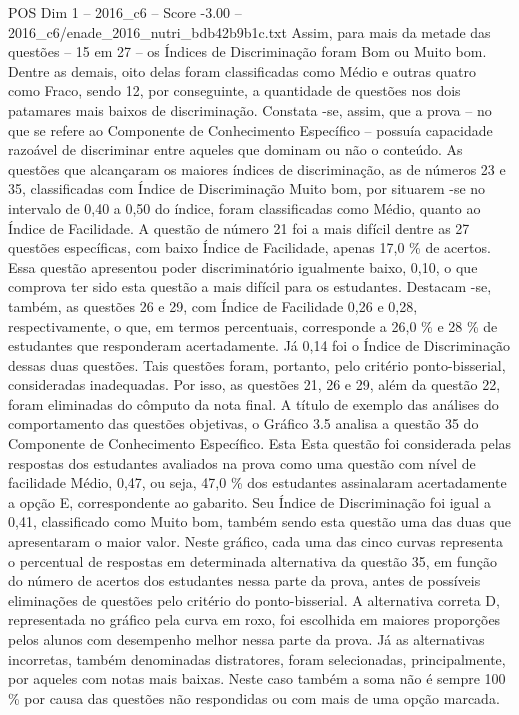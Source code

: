 \begin{textsample}{POS Dim 1 – 2016\_c6 – Score -3.00 – 2016\_c6/enade\_2016\_nutri\_bdb42b9b1c.txt}
Assim, para mais da metade das questões – 15 em 27 – os Índices de Discriminação foram Bom ou Muito bom.
Dentre as demais, oito delas foram classificadas como Médio e outras quatro como Fraco, sendo 12, por conseguinte, a quantidade de questões nos dois patamares mais baixos de discriminação.
Constata -se, assim, que a prova – no que se refere ao Componente de Conhecimento Específico – possuía capacidade razoável de discriminar entre aqueles que dominam ou não o conteúdo.
As questões que alcançaram os maiores índices de discriminação, as de números 23 e 35, classificadas com Índice de Discriminação Muito bom, por situarem -se no intervalo de 0,40 a 0,50 do índice, foram classificadas como Médio, quanto ao Índice de Facilidade.
A questão de número 21 foi a mais difícil dentre as 27 questões específicas, com baixo Índice de Facilidade, apenas 17,0 \% de acertos.
Essa questão apresentou poder discriminatório igualmente baixo, 0,10, o que comprova ter sido esta questão a mais difícil para os estudantes.
Destacam -se, também, as questões 26 e 29, com Índice de Facilidade 0,26 e 0,28, respectivamente, o que, em termos percentuais, corresponde a 26,0 \% e 28 \% de estudantes que responderam acertadamente.
Já 0,14 foi o Índice de Discriminação dessas duas questões.
Tais questões foram, portanto, pelo critério ponto-bisserial, consideradas inadequadas.
Por isso, as questões 21, 26 e 29, além da questão 22, foram eliminadas do cômputo da nota final.
A título de exemplo das análises do comportamento das questões objetivas, o Gráfico 3.5 analisa a questão 35 do Componente de Conhecimento Específico.
Esta Esta questão foi considerada pelas respostas dos estudantes avaliados na prova como uma questão com nível de facilidade Médio, 0,47, ou seja, 47,0 \% dos estudantes assinalaram acertadamente a opção E, correspondente ao gabarito.
Seu Índice de Discriminação foi igual a 0,41, classificado como Muito bom, também sendo esta questão uma das duas que apresentaram o maior valor.
Neste gráfico, cada uma das cinco curvas representa o percentual de respostas em determinada alternativa da questão 35, em função do número de acertos dos estudantes nessa parte da prova, antes de possíveis eliminações de questões pelo critério do ponto-bisserial.
A alternativa correta D, representada no gráfico pela curva em roxo, foi escolhida em maiores proporções pelos alunos com desempenho melhor nessa parte da prova.
Já as alternativas incorretas, também denominadas distratores, foram selecionadas, principalmente, por aqueles com notas mais baixas.
Neste caso também a soma não é sempre 100 \% por causa das questões não respondidas ou com mais de uma opção marcada.

\end{textsample}
